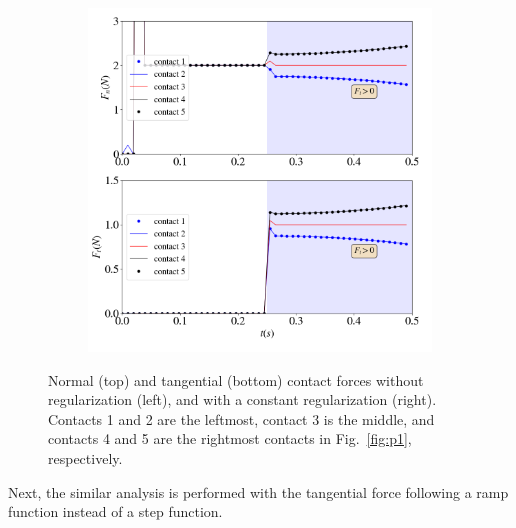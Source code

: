 \begin{itemize}
\begin{figure}[H]
\begin{subfigure}{0.48\columnwidth}
			\includegraphics[width=1.0\textwidth]{images/CD/slip_reg.png}
		\end{subfigure}	
		\caption{Normal (top) and tangential (bottom) contact forces without regularization (left), and with a constant regularization (right). Contacts 1 and 2 are the leftmost, contact 3 is the middle, and contacts 4 and 5 are the rightmost contacts in Fig.~\ref{fig:p1}, respectively. }\label{fig:slip}
	\end{figure}
	Next, the similar analysis is performed with the tangential force following a ramp function instead of a step function.
	\begin{figure}[H]
		\centering	
		\begin{subfigure}{0.48\columnwidth}	
			\centering

\end{subfigure}
\end{figure}
\end{itemize}
